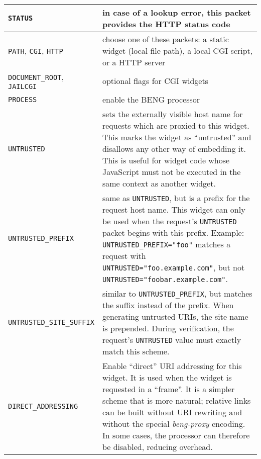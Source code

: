 \documentclass[a4paper,12pt]{article}
\begin{document}
\begin{longtable}{|l|p{8cm}|}
\hline
\verb|STATUS| & in case of a lookup error, this packet provides the
HTTP status code \\
\hline

\verb|PATH|, \verb|CGI|, \verb|HTTP| & choose one of these
packets: a static widget (local file path), a local CGI script, or a
HTTP server \\

\hline

\verb|DOCUMENT_ROOT|, \verb|JAILCGI| & optional flags for CGI
widgets \\

\hline
\verb|PROCESS| & enable the BENG processor \\

\hline

\verb|UNTRUSTED| & sets the externally visible host name for requests
which are proxied to this widget.  This marks the widget as
``untrusted'' and disallows any other way of embedding it.  This is
useful for widget code whose JavaScript must not be executed in the
same context as another widget. \\

\hline

\verb|UNTRUSTED_PREFIX| & same as \verb|UNTRUSTED|, but is a
prefix for the request host name.  This widget can only be used when
the request's \verb|UNTRUSTED| packet begins with this prefix.
Example: \verb|UNTRUSTED_PREFIX="foo"| matches a request with
\verb|UNTRUSTED="foo.example.com"|, but not
\verb|UNTRUSTED="foobar.example.com"|. \\

\hline

\verb|UNTRUSTED_SITE_SUFFIX| & similar to
\verb|UNTRUSTED_PREFIX|, but matches the suffix instead of the
prefix.  When generating untrusted URIs, the site name is prepended.
During verification, the request's \verb|UNTRUSTED| value must
exactly match this scheme. \\

\hline

\verb|DIRECT_ADDRESSING| & Enable ``direct'' URI addressing for this
widget.  It is used when the widget is requested in a ``frame''.  It
is a simpler scheme that is more natural; relative links can be built
without URI rewriting and without the special \emph{beng-proxy}
encoding.  In some cases, the processor can therefore be disabled,
reducing overhead. \\

\hline


\end{longtable}
\end{document}
